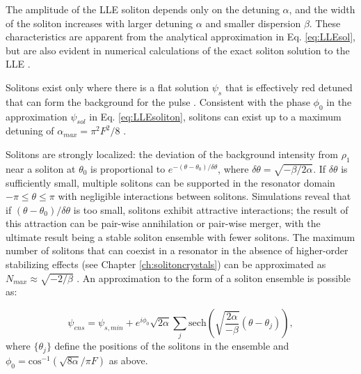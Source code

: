 {The amplitude of the LLE soliton depends only on the detuning $\alpha$, and the width of the soliton increases with larger detuning $\alpha$ and smaller dispersion $\beta$. These characteristics are apparent from the analytical approximation in Eq. \ref{eq:LLEsol}, but are also evident in numerical calculations of the exact soliton solution to the LLE \cite{Yi2015}.

Solitons exist only where there is a flat solution $\psi_s$ that is effectively red detuned that can form the background for the pulse \cite{Barashenkov1996,Coen2013}. Consistent with the phase $\phi_0$ in the approximation $\psi_{sol}$ in Eq. \ref{eq:LLEsoliton}, solitons can exist up to a maximum detuning of $\alpha_{max}=\pi^2 F^2/8$ \cite{Herr2014wArxiv}.


Solitons are strongly localized: the deviation of the background intensity from $\rho_1$ near a soliton at $\theta_0$ is proportional to $e^{-(\theta-\theta_0)/\delta\theta}$, where $\delta\theta=\sqrt{-\beta/2\alpha}$. If $\delta\theta$ is sufficiently small, multiple solitons can be supported in the resonator domain $-\pi\leq\theta\leq\pi$ with negligible interactions between solitons. Simulations reveal that if $(\theta-\theta_0)/\delta\theta$ is too small, solitons exhibit attractive interactions; the result of this attraction can be pair-wise annihilation or pair-wise merger, with the ultimate result being a stable soliton ensemble with fewer solitons. The maximum number of solitons that can coexist in a resonator in the absence of higher-order stabilizing effects (see Chapter \ref{ch:solitoncrystals}) can be approximated as $N_{max}\approx\sqrt{-2/\beta}$ \cite{Herr2014wArxiv}. An approximation to the form of a soliton ensemble is possible as:

\begin{equation}
\psi_{ens}=\psi_{s,min}+e^{i\phi_0}\sqrt{2\alpha}\sum_j \mathrm{sech}\left(\sqrt{\frac{2\alpha}{-\beta}}(\theta-\theta_j)\right),
\end{equation}
where $\{\theta_j\}$ define the positions of the solitons in the ensemble and $\phi_0=\mathrm{cos}^{-1}(\sqrt{8\alpha}/\pi F)$ as above.

}

